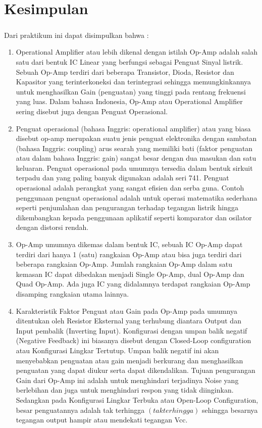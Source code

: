 \documentclass[12pt,a4paper]{article}
\begin{document}
\newpage
\section{Kesimpulan}
\subparagraph{ }
Dari praktikum ini dapat disimpulkan bahwa :
\begin{enumerate}

\item Operational Amplifier atau lebih dikenal dengan istilah Op-Amp adalah salah satu dari bentuk IC Linear yang berfungsi sebagai Penguat Sinyal listrik. Sebuah Op-Amp terdiri dari beberapa Transistor, Dioda, Resistor dan Kapasitor yang terinterkoneksi dan terintegrasi sehingga memungkinkannya untuk menghasilkan Gain (penguatan) yang tinggi pada rentang frekuensi yang luas. Dalam bahasa Indonesia, Op-Amp atau Operational Amplifier sering disebut juga dengan Penguat Operasional.

\item Penguat operasional (bahasa Inggris: operational amplifier) atau yang biasa disebut op-amp merupakan suatu jenis penguat elektronika dengan sambatan (bahasa Inggris: coupling) arus searah yang memiliki bati (faktor penguatan atau dalam bahasa Inggris: gain) sangat besar dengan dua masukan dan satu keluaran. Penguat operasional pada umumnya tersedia dalam bentuk sirkuit terpadu dan yang paling banyak digunakan adalah seri 741.
Penguat operasional adalah perangkat yang sangat efisien dan serba guna. Contoh penggunaan penguat operasional adalah untuk operasi matematika sederhana seperti penjumlahan dan pengurangan terhadap tegangan listrik hingga dikembangkan kepada penggunaan aplikatif seperti komparator dan osilator dengan distorsi rendah.

\item Op-Amp umumnya dikemas dalam bentuk IC, sebuah IC Op-Amp dapat terdiri dari hanya 1 (satu) rangkaian Op-Amp atau bisa juga terdiri dari beberapa rangkaian Op-Amp. Jumlah rangkaian Op-Amp dalam satu kemasan IC dapat dibedakan menjadi Single Op-Amp, dual Op-Amp dan Quad Op-Amp. Ada juga IC yang didalamnya terdapat rangkaian Op-Amp disamping rangkaian utama lainnya.

\item Karakteristik Faktor Penguat atau Gain pada Op-Amp pada umumnya ditentukan oleh Resistor Eksternal yang terhubung diantara Output dan Input pembalik (Inverting Input). Konfigurasi dengan umpan balik negatif (Negative Feedback) ini biasanya disebut dengan Closed-Loop configuration atau Konfigurasi Lingkar Tertutup. Umpan balik negatif ini akan menyebabkan penguatan atau gain menjadi berkurang dan menghasilkan penguatan yang dapat diukur serta dapat dikendalikan. Tujuan pengurangan Gain dari Op-Amp ini adalah untuk menghindari terjadinya Noise yang berlebihan dan juga untuk menghindari respon yang tidak diinginkan. Sedangkan pada Konfigurasi Lingkar Terbuka atau Open-Loop Configuration, besar penguatannya adalah tak terhingga $(tak terhingga)$ sehingga besarnya tegangan output hampir atau mendekati tegangan Vcc.

\end{enumerate}
\end{document}
